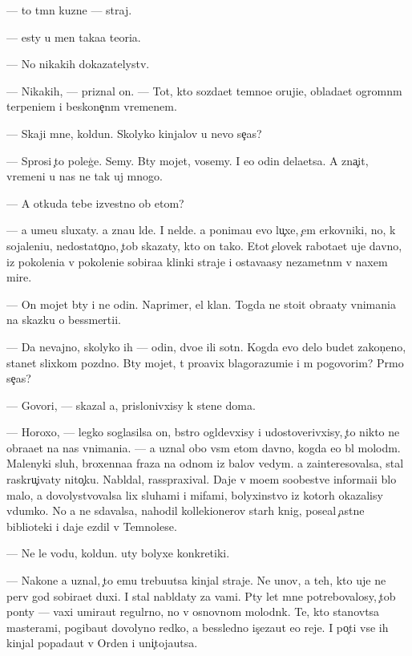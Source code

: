 \documentclass[10pt]{book}
\begin{document}
— {\C}to t{\e}mn{\yi}{\y} kuzne{\q} — straj.

— {\Y}esty u men{\ia} taka{\y}a teori{\y}a.

— No nikakih dokazatelystv.

— Nikakih, — priznal on. — Tot, kto sozda{\y}et temno{\y}e oruji{\y}e, oblada{\y}et ogromn{\yi}m terpeni{\y}em i beskone{\c}n{\yi}m vremenem.

— Skaji mne, koldun. Skolyko kinjalov u nevo se{\y}{\c}as?

— Sprosi {\c}to poleg{\c}e. Semy. B{\yi}ty mojet, vosemy. I {\y}e{\x}o odin dela{\y}etsa. A zna{\c}it, vremeni u nas ne tak uj mnogo.

— A otkuda tebe izvestno ob etom?

— {\Y}a ume{\y}u sluxaty. {\Y}a zna{\y}u l{\iu}de{\y}. I nel{\iu}de{\y}. {\Y}a ponima{\y}u {\y}evo lu{\c}xe, {\c}em {\q}erkovniki, no, k sojaleni{\y}u, nedostato{\c}no, {\c}tob{\yi} skazaty, kto on tako{\y}. Etot {\c}elovek rabota{\y}et uje davno, iz pokoleni{\y}a v pokoleni{\y}e sobira{\y}a klinki straje{\y} i ostava{\y}asy nezametn{\yi}m v naxem mire.

— On mojet b{\yi}ty i ne odin. Naprimer, {\q}el{\yi}{\y} klan. Togda ne sto{\y}it obra{\x}aty vnimani{\y}a na skazku o bessmerti{\y}i.

— Da nevajno, skolyko ih — odin, dvo{\y}e ili sotn{\ia}. Kogda {\y}evo delo budet zakon{\c}eno, stanet slixkom pozdno. B{\yi}ty mojet, t{\yi} pro{\y}avix blagorazumi{\y}e i m{\yi} pogovorim? Pr{\ia}mo se{\y}{\c}as?

— Govori, — skazal {\y}a, prislonivxisy k stene doma.

— Horoxo, — legko soglasilsa on, b{\yi}stro ogl{\ia}devxisy i udostoverivxisy, {\c}to nikto ne obra{\x}a{\y}et na nas vnimani{\y}a. — {\Y}a uznal obo vs{\e}m etom davno, kogda {\y}e{\x}o b{\yi}l molod{\yi}m. Malenyki{\y} sluh, broxenna{\y}a fraza na odnom iz balov vedym. {\Y}a zainteresovalsa, stal raskru{\c}ivaty nito{\c}ku. Nabl{\iu}dal, rasspraxival. Daje v mo{\y}em soob{\x}estve informa{\q}i{\y}i b{\yi}lo malo, {\y}a dovolystvovalsa lix sluhami i mifami, bolyxinstvo iz kotor{\yi}h okazalisy v{\yi}dumko{\y}. No {\y}a ne sdavalsa, nahodil kollek{\q}ionerov star{\yi}h knig, pose{\x}al {\c}astn{\yi}{\y}e biblioteki i daje {\y}ezdil v Temnoles{\y}e.

— Ne le{\y} vodu, koldun. {\C}uty bolyxe konkretiki.

— Nakone{\q} {\y}a uznal, {\c}to {\y}emu trebu{\y}utsa kinjal{\yi} straje{\y}. Ne {\y}un{\q}ov, a teh, kto uje ne perv{\yi}{\y} god sobira{\y}et duxi. I stal nabl{\iu}daty za vami. P{\ia}ty let mne potrebovalosy, {\c}tob{\yi} pon{\ia}ty — vaxi umira{\y}ut regul{\ia}rno, no v osnovnom molodn{\ia}k. Te, kto stanov{\ia}tsa masterami, pogiba{\y}ut dovolyno redko, a bessledno is{\c}eza{\y}ut {\y}e{\x}o reje. I po{\c}ti vse ih kinjal{\yi} popada{\y}ut v Orden i uni{\c}toja{\y}utsa.
\end{document}
